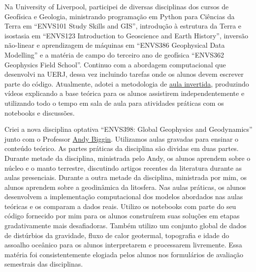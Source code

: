 \documentclass[12pt,a4paper,oneside]{book}
\newcommand{\UoL}{University of Liverpool}
\begin{document}
Na \UoL{}, participei de diversas disciplinas dos cursos de
Geofísica e Geologia, ministrando
programação em Python para Ciências da Terra em ``ENVS101
Study Skills and GIS'',
introdução à estrutura da Terra e isostasia em ``ENVS123 Introduction to
Geoscience and Earth History'',
inversão não-linear e aprendizagem de máquinas em ``ENVS386 Geophysical Data
Modelling''
e a matéria de campo do terceiro ano de geofísica
``ENVS362 Geophysics Field School''.
Continuo com a abordagem computacional que desenvolvi na UERJ, dessa vez
incluindo tarefas onde os alunos devem escrever parte do código.
Atualmente, adotei a metodologia de
\href{https://pt.wikipedia.org/wiki/Aula_invertida}{aula invertida}, produzindo
vídeos explicando a base teórica para os alunos assistirem independentemente e
utilizando todo o tempo em sala de aula para atividades práticas com os
notebooks e discussões.

Criei a nova disciplina optativa ``ENVS398: Global Geophysics and Geodynamics''
junto com o Professor
\href{https://www.liverpool.ac.uk/environmental-sciences/staff/andrew-biggin/}{Andy Biggin}.
Utilizamos aulas gravadas para ensinar o conteúdo teórico.
As partes práticas da disciplina são dividas em duas partes.
Durante metade da disciplina, ministrada pelo Andy, os alunos aprendem sobre o
núcleo e o manto terrestre, discutindo artigos recentes da literatura durante
as aulas presenciais.
Durante a outra metade da disciplina, ministrada por mim, os alunos aprendem
sobre a geodinâmica da litosfera.
Nas aulas práticas, os alunos desenvolvem a implementação computacional dos
modelos abordados nas aulas teóricas e os comparam a dados reais.
Utilizo os notebooks com parte do seu código fornecido por mim para os alunos
construírem suas soluções em etapas gradativamente mais desafiadoras.
Também utilizo um conjunto global de dados de distúrbios da gravidade, fluxo de
calor geotermal, topografia e idade do assoalho oceânico para os alunos
interpretarem e processarem livremente.
Essa matéria foi consistentemente elogiada pelos alunos nos formulários de
avaliação semestrais das disciplinas.
\end{document}
